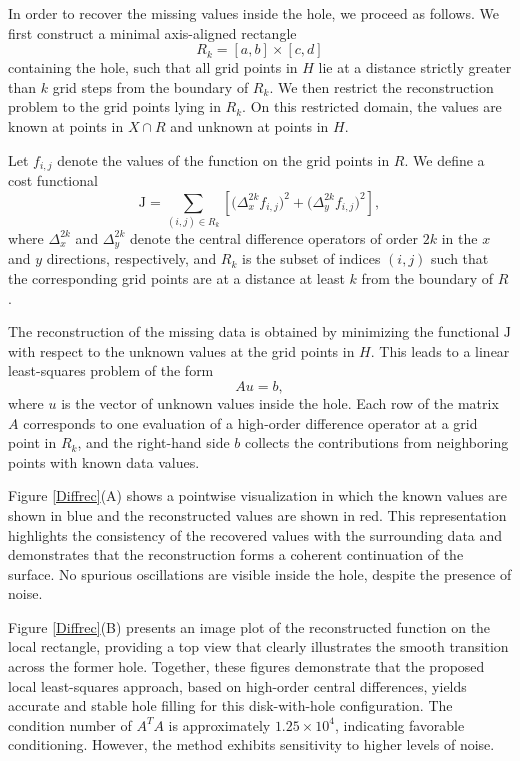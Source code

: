 \documentclass[11pt,oneside,reqno]{amsart}
\theoremstyle{plain}
\numberwithin{equation}{section}
\begin{document}
In order to recover the missing values inside the hole, we proceed as
follows.
We first construct a minimal axis-aligned rectangle
\[
R_k=[a,b]\times[c,d]
\]
containing the hole, such that all grid points in $H$ lie at a distance
strictly greater than $k$ grid steps from the boundary of $R_k$.
We then restrict the reconstruction problem to the grid points lying in
$R_k$.
On this restricted domain, the values are known at points in $X\cap R$
and unknown at points in $H$.

Let $f_{i,j}$ denote the values of the function on the grid points in $R$.
We define a cost functional
\[
\mathrm{J}=\sum_{(i,j)\in R_k}
\left[
\bigl(\Delta_x^{2k} f_{i,j}\bigr)^2
+
\bigl(\Delta_y^{2k} f_{i,j}\bigr)^2
\right],
\]
where $\Delta_x^{2k}$ and $\Delta_y^{2k}$ denote the central difference
operators of order $2k$ in the $x$ and $y$ directions, respectively, and
$R_k$ is the subset of indices $(i,j)$ such that the corresponding grid
points are at a distance at least $k$ from the boundary of $R$.

The reconstruction of the missing data is obtained by minimizing the
functional $\mathrm{J}$ with respect to the unknown values at the grid
points in $H$.
This leads to a linear least-squares problem of the form
\[
A u = b,
\]
where $u$ is the vector of unknown values inside the hole.
Each row of the matrix $A$ corresponds to one evaluation of a
high-order difference operator at a grid point in $R_k$, and the
right-hand side $b$ collects the contributions from neighboring points
with known data values.

Figure \ref{Diffrec}(A) shows a pointwise visualization in which
the known values are shown in blue
and the reconstructed values are shown in red.
This representation highlights the consistency
of the recovered values with the surrounding data
and demonstrates that the reconstruction forms
a coherent continuation of the surface.
No spurious oscillations are visible inside the hole,
despite the presence of noise.

Figure \ref{Diffrec}(B) presents an image plot of the reconstructed function
on the local rectangle, providing a top view
that clearly illustrates the smooth transition
across the former hole.
Together, these figures demonstrate  
that the proposed local least-squares approach,  
based on high-order central differences,  
yields accurate and stable hole filling  
for this disk-with-hole configuration.  
The condition number of $A^TA$  
is approximately $1.25\times 10^{4}$,  
indicating favorable conditioning.  
However, the method exhibits sensitivity  
to higher levels of noise.
\end{document}
